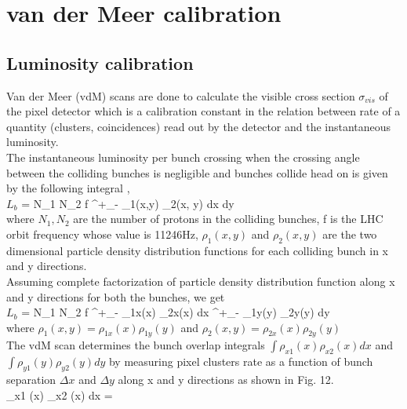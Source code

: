  \section{van der Meer calibration}
 \label{sec:vdm}

 \subsection{Luminosity calibration}
Van der Meer (vdM) scans are done to calculate the visible cross section $\sigma_{vis}$ of the pixel detector which is a calibration constant in the relation between rate of a quantity (clusters, coincidences) read out by the detector and the instantaneous luminosity. \\

The instantaneous luminosity  per bunch crossing when the crossing angle between the colliding bunches is negligible and bunches collide head on is given by the following integral \cite{CMS-PAS-LUM-13-001}, \\

$L_{b}$ = N_1 N_2 f \int^{+\infty}_{-\infty} \rho_1(x,y) \rho_2(x, y) dx dy \\

where $N_1, N_2$ are the number of protons in the colliding bunches, f is the LHC orbit frequency whose value is 11246Hz,  $\rho_1(x,y)$ and $\rho_2(x,y)$ are the two dimensional particle density distribution functions for each colliding bunch in x and y directions. \\

Assuming complete factorization of particle density distribution function along x and y directions for both the bunches, we get \\

$L_{b}$ = N_1 N_2 f \int^{+\infty}_{-\infty} \rho_{1x}(x) \rho_{2x}(x)  dx   \int^{+\infty}_{-\infty} \rho_{1y}(y) \rho_{2y}(y)  dy \\

where $\rho_1(x,y) = \rho_{1x}(x) \rho_{1y} (y)$ and $\rho_2(x,y) = \rho_{2x}(x) \rho_{2y} (y)$ \\

The vdM scan determines the bunch  overlap integrals $\int \rho_{x1} (x) \rho_{x2} (x) dx$ and  $\int \rho_{y1}(y) \rho_{y2} (y) dy$ by measuring pixel clusters rate as a function of bunch separation $\Delta x$ and $\Delta y$ along x and y directions as shown in Fig. 12. \\


\int \rho_{x1} (x) \rho_{x2} (x) dx =  \\


